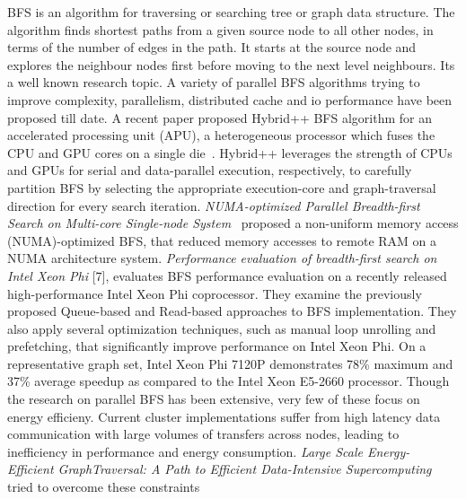 BFS is an algorithm for traversing or searching tree or graph data
structure. The algorithm finds shortest paths from a given source node
to all other nodes, in terms of the number of edges in the path. It
starts at the source node and explores the neighbour nodes first
before moving to the next level neighbours.  Its a well known research
topic. A variety of parallel BFS algorithms trying to improve
complexity, parallelism, distributed cache and io performance have
been proposed till date.
\newline
A recent paper proposed Hybrid++ BFS algorithm for an accelerated
processing unit (APU), a heterogeneous processor which fuses the CPU
and GPU cores on a single die~\cite{HYBRIS}. Hybrid++ leverages the
strength of CPUs and GPUs for serial and data-parallel execution,
respectively, to carefully partition BFS by selecting the appropriate
execution-core and graph-traversal direction for every search
iteration.
\newline
\emph{NUMA-optimized Parallel Breadth-first Search on Multi-core
Single-node System}~\cite{NUMA-BFS} proposed a non-uniform memory
access (NUMA)-optimized BFS, that reduced memory accesses to remote
RAM on a NUMA architecture system.
\newline
\emph{Performance evaluation of breadth-first search on Intel Xeon
Phi} [7], evaluates BFS performance evaluation on a recently released
high-performance Intel Xeon Phi coprocessor. They examine the
previously proposed Queue-based and Read-based approaches to BFS
implementation. They also apply several optimization techniques, such
as manual loop unrolling and prefetching, that significantly improve
performance on Intel Xeon Phi. On a representative graph set, Intel
Xeon Phi 7120P demonstrates 78\% maximum and 37\% average speedup as
compared to the Intel Xeon E5-2660 processor.
\newline
Though the research on parallel BFS has
been extensive, very few of these focus on energy efficieny.
\newline
Current cluster implementations suffer from high latency data
communication with large volumes of transfers across nodes, leading to
inefficiency in performance and energy consumption. \emph{Large Scale
Energy- Efficient GraphTraversal: A Path to Efficient Data-Intensive
Supercomputing}~\cite{INTEL-BFS} tried to overcome these constraints
